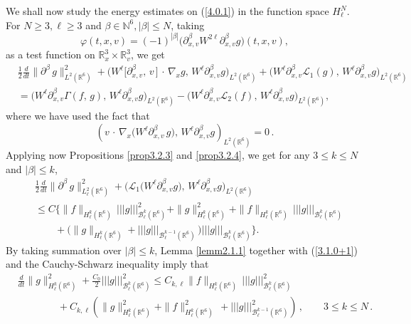 \documentclass{amsart}[12pt, article]
\begin{document}
We shall now study the
energy estimates on (\ref{4.0.1}) in the function space
$H^N_\ell$.
For $N\geq 3, \ell\geq 3$  and $\beta\in{{\mathbb N}}^6,
|\beta|\leq N$, taking
$$
\varphi(t, x, v)= (-1)^{|\beta|}\Big(\partial^\beta_{x, v}
W^{2\ell}\partial^\beta_{x, v}g\Big)(t, x, v),
$$
as a test function on ${{{\mathbb R}}}^3_x\times{{{\mathbb R}}}^3_v$, we get
\begin{align*}
&\frac 12 \frac{d}{d t}\|\partial^\beta\,g\|^2_{L^2({{{\mathbb R}}}^6)}+
\Big(W^\ell\Big[\partial^\beta_{x, v},\, v\,\Big]\,\cdot\,\nabla_x
g,\, W^\ell\partial^\beta_{x, v}g\Big)_{L^2({{{\mathbb R}}}^6)}+
\Big(W^\ell\partial^\beta_{x, v} {{\mathcal L}}_1(g),\,
W^\ell\partial^\beta_{x, v}g\Big)_{L^2({{{\mathbb R}}}^6)}\\
&=\Big(W^\ell\partial^\beta_{x, v} \Gamma(f, \, g),\,
W^\ell\partial^\beta_{x, v}g\Big)_{L^2({{{\mathbb R}}}^6)}-
\Big(W^\ell\partial^\beta_{x, v} {{\mathcal L}}_2(f),\,
W^\ell\partial^\beta_{x, v}g\Big)_{L^2({{{\mathbb R}}}^6)},
\end{align*}
where we have used the fact that
$$
\left( v\,\cdot\,\nabla_x \Big(W^\ell\partial^\beta_{x, v}\,
g\Big),\, W^\ell\partial^\beta_{x, v}g\right)_{L^2({{{\mathbb R}}}^6)}=0\, .
$$
Applying now Propositions \ref{prop3.2.3} and
\ref{prop3.2.4}, we get for any  $3\leq k\leq N$ and
$|\beta|\leq k$,
\begin{align*}
&\frac 12 \frac{d}{d t}\|\partial^\beta\,g\|^2_{L^2_\ell({{{\mathbb R}}}^6)}+
\Big({{\mathcal L}}_1\Big(W^\ell\partial^\beta_{x, v} g\Big),\,
W^\ell\partial^\beta_{x, v}g\Big)_{L^2({{{\mathbb R}}}^6)}\\
&\leq C\Big\{ \|f\|_{H^k_\ell({{{\mathbb R}}}^6)} \,
|||g|||^2_{{{\mathcal B}}^{k}_\ell({{{\mathbb R}}}^6)}+ \|g\|^2_{H^{k}_\ell({{{\mathbb R}}}^6)}+
\|f\|_{H^k_\ell({{{\mathbb R}}}^6)} \,
|||g|||_{{{\mathcal B}}^{k}_\ell({{{\mathbb R}}}^6)}\\
&\qquad+  \Big(\|g\|_{H^{k}_\ell({{{\mathbb R}}}^6)}
+|||g|||_{{{\mathcal B}}^{k-1}_\ell({{{\mathbb R}}}^6)}
 \,\Big)|||g|||_{{{\mathcal B}}^{k}_\ell({{{\mathbb R}}}^6)}\Big\}.
\end{align*}
By taking summation over $|\beta|\leq k$, Lemma \ref{lemm2.1.1} together with
(\ref{3.1.0+1})
 and the Cauchy-Schwarz inequality imply that
\begin{align}\label{4.0.3}
&\frac{d}{d t}\|g\|^2_{H^k_\ell({{{\mathbb R}}}^6)}+\frac{C_0}{2}
|||g|||^2_{{{\mathcal B}}^{k}_\ell({{{\mathbb R}}}^6)}\leq C_{k, \ell}
\|f\|_{H^k_\ell({{{\mathbb R}}}^6)} \,
|||g|||^2_{{{\mathcal B}}^{k}_\ell({{{\mathbb R}}}^6)}\\
&\qquad\qquad+C_{k, \ell}\left( \|g\|^2_{H^{k}_\ell({{{\mathbb R}}}^6)}+
\|f\|^2_{H^k_\ell({{{\mathbb R}}}^6)} \, +|||g|||^2_{{{\mathcal B}}^{k-1}_\ell({{{\mathbb R}}}^6)}
 \right)\,, \qquad 3\leq k\leq N\, .\nonumber
\end{align}
\end{document}
